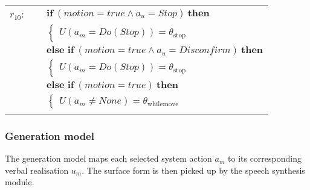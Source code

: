 \begin{footnotesize}
\begin{longtable}{p{2cm}l}
$r_{10}$: \ \ & $ \textbf{if} \ (\mathit{motion}\!=\!\mathit{true} \land \mathit{a_u}\!=\!\mathit{Stop}) \ \textbf{then} $ \\
 & \;\;\;\;\; $ \begin{cases}U(\mathit{a_m}\!=\!\mathit{Do(Stop)})\!=\!\theta_{\mathrm{stop}} \end{cases}$ \vspace{1mm} \\ & $ \textbf{else if} \ (\mathit{motion}\!=\!\mathit{true} \land \mathit{a_u}\!=\!\mathit{Disconfirm}) \ \textbf{then}$ \\
& \;\;\;\;\; $ \begin{cases}U(\mathit{a_m}\!=\!\mathit{Do(Stop)})\!=\!\theta_{\mathrm{stop}} \end{cases}$ \vspace{1mm} \\ & $ \textbf{else if} \ (\mathit{motion}\!=\!\mathit{true}) \ \textbf{then}$ \\
& \;\;\;\;\; $ \begin{cases}U(\mathit{a_m}\!\neq\!\mathit{None})\!=\!\theta_{\mathrm{whilemove}} \end{cases}$ \\ \\[-1mm]
\end{longtable}
\end{footnotesize}

\subsubsection*{Generation model}

The generation model maps each selected system action $a_m$ to its corresponding verbal realisation $u_m$.  The surface form is then picked up by the speech synthesis module.
 
